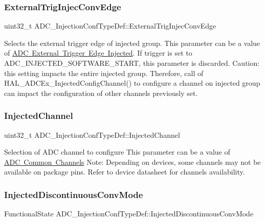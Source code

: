 \subsubsection{\texorpdfstring{ExternalTrigInjecConvEdge}{ExternalTrigInjecConvEdge}}
{\footnotesize\ttfamily uint32\+\_\+t A\+D\+C\+\_\+\+Injection\+Conf\+Type\+Def\+::\+External\+Trig\+Injec\+Conv\+Edge}

Selects the external trigger edge of injected group. This parameter can be a value of \mbox{\hyperlink{group___a_d_c_ex___external__trigger__edge___injected}{A\+DC External Trigger Edge Injected}}. If trigger is set to A\+D\+C\+\_\+\+I\+N\+J\+E\+C\+T\+E\+D\+\_\+\+S\+O\+F\+T\+W\+A\+R\+E\+\_\+\+S\+T\+A\+RT, this parameter is discarded. Caution\+: this setting impacts the entire injected group. Therefore, call of H\+A\+L\+\_\+\+A\+D\+C\+Ex\+\_\+\+Injected\+Config\+Channel() to configure a channel on injected group can impact the configuration of other channels previously set. \mbox{\label{struct_a_d_c___injection_conf_type_def_aad0cab6ed3f66e8ffa4bd0490298b715}} 
\subsubsection{\texorpdfstring{InjectedChannel}{InjectedChannel}}
{\footnotesize\ttfamily uint32\+\_\+t A\+D\+C\+\_\+\+Injection\+Conf\+Type\+Def\+::\+Injected\+Channel}

Selection of A\+DC channel to configure This parameter can be a value of \mbox{\hyperlink{group___a_d_c__channels}{A\+DC Common Channels}} Note\+: Depending on devices, some channels may not be available on package pins. Refer to device datasheet for channels availability. \mbox{\label{struct_a_d_c___injection_conf_type_def_ab842abce605e1eaf11077fd3825379e0}} 
\subsubsection{\texorpdfstring{InjectedDiscontinuousConvMode}{InjectedDiscontinuousConvMode}}
{\footnotesize\ttfamily Functional\+State A\+D\+C\+\_\+\+Injection\+Conf\+Type\+Def\+::\+Injected\+Discontinuous\+Conv\+Mode}


